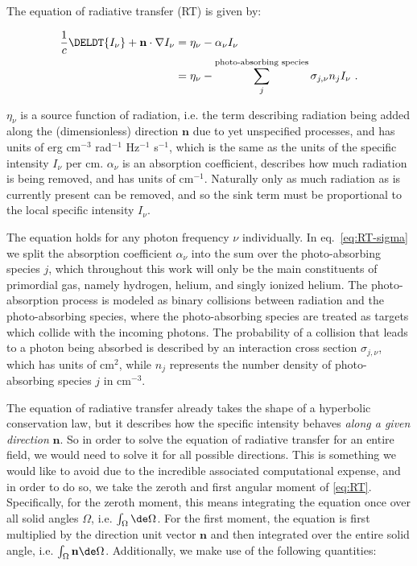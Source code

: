 The equation of radiative transfer (RT) is given by:

\begin{align}
    \frac{1}{c} \DELDT{I_\nu} + \mathbf{n} \cdot \nabla I_\nu
        &= \eta_\nu - \alpha_\nu I_\nu \label{eq:RT} \\
        &= \eta_\nu - \sum_j^{\text{photo-absorbing\ species}} \sigma_{j,\nu} n_j I_\nu \ .
\label{eq:RT-sigma}
\end{align}

$\eta_\nu$ is a source function of radiation, i.e. the term describing radiation being added along
the (dimensionless) direction $\mathbf{n}$ due to yet unspecified processes, and has units of erg
cm$^{-3}$ rad$^{-1}$ Hz$^{-1}$ s$^{-1}$, which is the same as the units of the specific intensity
$I_\nu$ per cm. $\alpha_\nu$ is an absorption coefficient, describes how much radiation is being
removed, and has units of cm$^{-1}$. Naturally only as much radiation as is currently present can be
removed, and so the sink term must be proportional to the local specific intensity $I_\nu$.

The equation holds for any photon frequency $\nu$ individually. In eq.~\ref{eq:RT-sigma} we split
the absorption coefficient $\alpha_\nu$ into the sum over the photo-absorbing species $j$, which
throughout this work will only be the main constituents of primordial gas, namely hydrogen, helium,
and singly ionized helium. The photo-absorption process is modeled as binary collisions between
radiation and the photo-absorbing species, where the photo-absorbing species are treated as targets
which collide with the incoming photons. The probability of a collision that leads to a photon being
absorbed is described by an interaction cross section $\sigma_{j,\nu}$, which has units of cm$^2$,
while $n_j$ represents the number density of photo-absorbing species $j$ in cm$^{-3}$.




The equation of radiative transfer already takes the shape of a hyperbolic conservation law, but it
describes how the specific intensity behaves \emph{along a given direction} $\mathbf{n}$. So in
order to solve the equation of radiative transfer for an entire field, we would need to solve it for
all possible directions. This is something we would like to avoid due to the incredible associated
computational expense, and in order to do so, we take the zeroth and first angular moment of
\ref{eq:RT}. Specifically, for the zeroth moment, this means integrating the equation once over all
solid angles $\Omega$, i.e. $\int_\Omega \de \Omega$. For the first moment, the equation is first
multiplied by the direction unit vector $\mathbf{n}$ and then integrated over the entire solid
angle, i.e. $\int_\Omega \mathbf{n} \de \Omega$. Additionally, we make use of the following
quantities:


